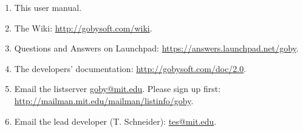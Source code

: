 \begin{enumerate}
\item This user manual. %
\item The Wiki: \url{http://gobysoft.com/wiki}.
\item Questions and Answers on Launchpad: \url{https://answers.launchpad.net/goby}.
\item The developers' documentation: \url{http://gobysoft.com/doc/2.0}.
\item Email the listserver \href{mailto:goby@mit.edu}{goby@mit.edu}. Please sign up first: \url{http://mailman.mit.edu/mailman/listinfo/goby}.
\item Email the lead developer (T. Schneider): \href{mailto:tes@mit.edu}{tes@mit.edu}.
\end{enumerate}

